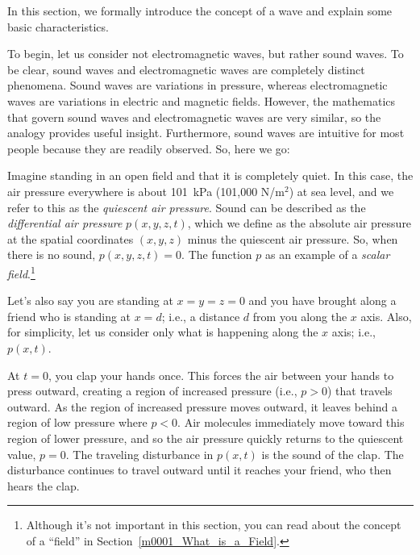 

\label{m0074_Fundamentals_of_Waves} %

In this section, we formally introduce the concept of a wave and explain some basic characteristics.

To begin, let us consider not electromagnetic waves, but rather sound waves.  
To be clear, sound waves 
and electromagnetic waves are completely distinct phenomena. Sound waves are variations in pressure, whereas electromagnetic waves are variations in electric and magnetic fields.
However, the mathematics that govern sound waves and electromagnetic waves are very similar, so the analogy provides useful insight.
Furthermore, sound waves are intuitive for most people because they are readily observed.   
So, here we go:

Imagine standing in an open field and that it is completely quiet.
In this case, the air pressure everywhere is about 101~kPa (101,000 N/m$^2$) at sea level, %
and we refer to this as the \emph{quiescent air pressure}.
Sound can be described as the \emph{differential air pressure} $p(x,y,z,t)$, which we define as the absolute air pressure at the spatial coordinates $(x,y,z)$ minus the quiescent air pressure. 
So, when there is no sound, $p(x,y,z,t)=0$.
The function $p$ as an example of a  \emph{scalar field}.\footnote{Although it's not important in this section, you can read about the concept of a ``field'' in Section~\ref{m0001_What_is_a_Field}.}

Let's also say you are standing at $x=y=z=0$ and you have brought along a friend who is standing at $x=d$; i.e., a distance $d$ from you along the $x$ axis.
Also, for simplicity, let us consider only what is happening along the $x$ axis; i.e., $p(x,t)$.

At $t=0$, you clap your hands once.
This forces the air between your hands to press outward, creating a region of increased pressure (i.e., $p>0$) that travels outward.  
As the region of increased pressure moves outward, it leaves behind a region of low pressure where $p<0$.
Air molecules immediately move toward this region of lower pressure, and so the air pressure quickly returns to the quiescent value, $p=0$.
The traveling disturbance in $p(x,t)$ is the sound of the clap.
The disturbance continues to travel outward until it reaches your friend, who then hears the clap. 

